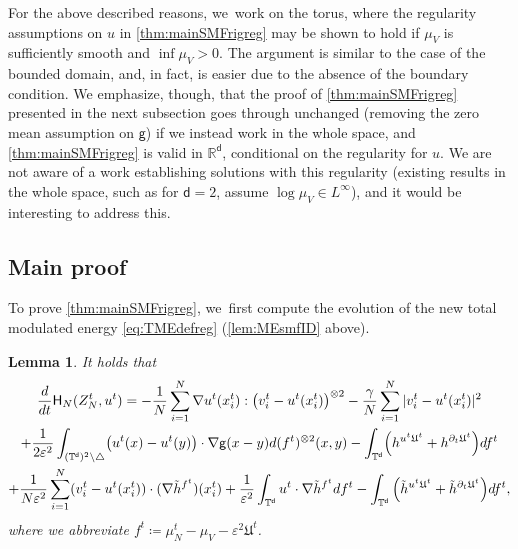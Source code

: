 \documentclass[JEP,XML,SOM,Unicode,published]{cedram}
\theoremstyle{plain}
\newtheorem{lemma}[thm]{Lemma}
\theoremstyle{definition}
\DeclarePairedDelimiter{\pa}{\lparen}{\rparen}
\let\div\relax
\DeclareMathOperator{\div}{\mathrm{div}}
\newcommand{\R}{{\mathbb{R}}}
\newcommand{\T}{{\mathbb{T}}}
\let\ga\gamma
\let\vep\varepsilon
\let\nab\nabla
\let\p\partial
\let\tl\tilde
\let\uz Z
\newcommand{\Uu}{\mathfrak{U}}
\newcommand{\Hr}{\mathsf{H}}
\renewcommand{\d}{\mathsf{d}}
\newcommand{\g}{{\mathsf{g}}}
\begin{document}
For the above described reasons, we~work on the torus, where the regularity assumptions on $u$ in \cref{thm:mainSMFrigreg} may be shown to hold if $\mu_V$ is sufficiently smooth and $\inf\mu_V>0$. The argument is similar to the case of the bounded domain, and, in fact, is easier due to the absence of the boundary condition. We emphasize, though, that the proof of \cref{thm:mainSMFrigreg} presented in the next subsection goes through unchanged (removing the zero mean assumption on $\g$) if we instead work in the whole space, and \cref{thm:mainSMFrigreg} is valid in $\R^\d$, conditional on the regularity for $u$. We are not aware of a work establishing solutions with this regularity (existing results in the whole space, such as \cite{Duerinckx2018} for $\d=2$, assume $\log\mu_V \in L^\infty$), and it would be interesting to address this.

\subsection{Main proof}
To prove \cref{thm:mainSMFrigreg}, we~first compute the evolution of the new total modulated energy \eqref{eq:TMEdefreg} (\cf \cref{lem:MEsmfID} above).

\begin{lemma}\label{lem:MEsmfIDreg}
It holds that
\begin{multline}\label{eq:MEsmfIDreg}
\frac{d}{dt}\Hr_{N}(\uz_N^t,u^t) = -\frac{1}{N}\sum_{i=1}^N \nab u^t(x_i^t) : \pa*{v_i^t - u^t(x_i^t)}^{\otimes 2} -\frac{\ga}{N}\sum_{i=1}^N |v_i^t-u^t(x_i^t)|^2\\
+\frac{1}{2\vep^2}\int_{(\T^\d)^2\setminus\triangle} \pa*{u^t(x)-u^t(y)}\cdot\nabla\g(x-y)d(f^t)^{\otimes 2}(x,y) -\int_{\T^\d}\pa*{\div h^{u^t\Uu^t}+h^{\p_t\Uu^t}}df^t\\
+\frac{1}{N\vep^2}\sum_{i=1}^N (v_i^t-u^t(x_i^t))\cdot(\nab\tl{h}^{f^t})(x_i^t) + \frac{1}{\vep^2}\int_{\T^\d}u^t\cdot\nab \tl{h}^{f^t} d{f^t} - \int_{\T^\d} \Big(\div \tl{h}^{u^t\Uu^t} +\tl{h}^{\p_t\Uu^t}\Big) df^t,
\end{multline}
where we abbreviate $f^t\coloneqq \mu_N^t - \mu_V-\vep^2\Uu^t$.
\end{lemma}
\end{document}
